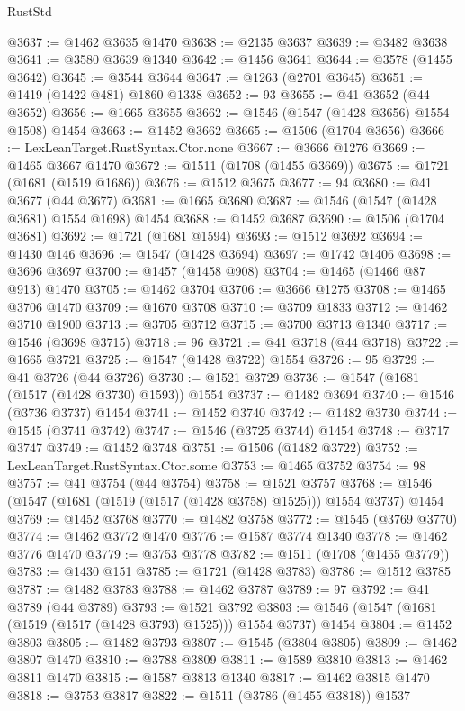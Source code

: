 \begin{lexlean}{RustStd}
\begin{coremodule}
{\begin{coremodule}
{{{{{{{{{{{{{{{{{{{{{{{{{{{{{{@3637 := @1462 @3635 @1470
@3638 := @2135 @3637
@3639 := @3482 @3638
@3641 := @3580 @3639 @1340
@3642 := @1456 @3641
@3644 := @3578 (@1455 @3642)
@3645 := @3544 @3644
@3647 := @1263 (@2701 @3645)
@3651 := @1419 (@1422 @481) @1860 @1338
@3652 := 93
@3655 := @41 @3652 (@44 @3652)
@3656 := @1665 @3655
@3662 := @1546 (@1547 (@1428 @3656) @1554 @1508) @1454
@3663 := @1452 @3662
@3665 := @1506 (@1704 @3656)
@3666 := LexLeanTarget.RustSyntax.Ctor.none
@3667 := @3666 @1276
@3669 := @1465 @3667 @1470
@3672 := @1511 (@1708 (@1455 @3669))
@3675 := @1721 (@1681 (@1519 @1686))
@3676 := @1512 @3675
@3677 := 94
@3680 := @41 @3677 (@44 @3677)
@3681 := @1665 @3680
@3687 := @1546 (@1547 (@1428 @3681) @1554 @1698) @1454
@3688 := @1452 @3687
@3690 := @1506 (@1704 @3681)
@3692 := @1721 (@1681 @1594)
@3693 := @1512 @3692
@3694 := @1430 @146
@3696 := @1547 (@1428 @3694)
@3697 := @1742 @1406
@3698 := @3696 @3697
@3700 := @1457 (@1458 @908)
@3704 := @1465 (@1466 @87 @913) @1470
@3705 := @1462 @3704
@3706 := @3666 @1275
@3708 := @1465 @3706 @1470
@3709 := @1670 @3708
@3710 := @3709 @1833
@3712 := @1462 @3710 @1900
@3713 := @3705 @3712
@3715 := @3700 @3713 @1340
@3717 := @1546 (@3698 @3715)
@3718 := 96
@3721 := @41 @3718 (@44 @3718)
@3722 := @1665 @3721
@3725 := @1547 (@1428 @3722) @1554
@3726 := 95
@3729 := @41 @3726 (@44 @3726)
@3730 := @1521 @3729
@3736 := @1547 (@1681 (@1517 (@1428 @3730) @1593)) @1554
@3737 := @1482 @3694
@3740 := @1546 (@3736 @3737) @1454
@3741 := @1452 @3740
@3742 := @1482 @3730
@3744 := @1545 (@3741 @3742)
@3747 := @1546 (@3725 @3744) @1454
@3748 := @3717 @3747
@3749 := @1452 @3748
@3751 := @1506 (@1482 @3722)
@3752 := LexLeanTarget.RustSyntax.Ctor.some
@3753 := @1465 @3752
@3754 := 98
@3757 := @41 @3754 (@44 @3754)
@3758 := @1521 @3757
@3768 := @1546 (@1547 (@1681 (@1519 (@1517 (@1428 @3758) @1525))) @1554 @3737) @1454
@3769 := @1452 @3768
@3770 := @1482 @3758
@3772 := @1545 (@3769 @3770)
@3774 := @1462 @3772 @1470
@3776 := @1587 @3774 @1340
@3778 := @1462 @3776 @1470
@3779 := @3753 @3778
@3782 := @1511 (@1708 (@1455 @3779))
@3783 := @1430 @151
@3785 := @1721 (@1428 @3783)
@3786 := @1512 @3785
@3787 := @1482 @3783
@3788 := @1462 @3787
@3789 := 97
@3792 := @41 @3789 (@44 @3789)
@3793 := @1521 @3792
@3803 := @1546 (@1547 (@1681 (@1519 (@1517 (@1428 @3793) @1525))) @1554 @3737) @1454
@3804 := @1452 @3803
@3805 := @1482 @3793
@3807 := @1545 (@3804 @3805)
@3809 := @1462 @3807 @1470
@3810 := @3788 @3809
@3811 := @1589 @3810
@3813 := @1462 @3811 @1470
@3815 := @1587 @3813 @1340
@3817 := @1462 @3815 @1470
@3818 := @3753 @3817
@3822 := @1511 (@3786 (@1455 @3818)) @1537
}}}}}}}}}}}}}}}}}}}}}}}}}}}}}}
\end{coremodule}}
\end{coremodule}
\end{lexlean}
